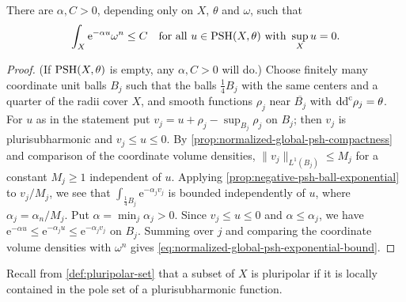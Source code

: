 \begin{corollary}\label{cor:normalized-global-psh-exponential-bound}
There are $\alpha,C>0$, depending only on $X$, $\theta$ and $\omega$, such that
\begin{equation}\label{eq:normalized-global-psh-exponential-bound}
 \int_X\mathrm e^{-\alpha u}\omega^n\leq C
       \quad\text{for all }u\in\mathrm{PSH}(X,\theta)\text{ with }\sup_Xu=0.
\end{equation}
\end{corollary}
\begin{proof}
(If $\mathrm{PSH}(X,\theta)$ is empty, any $\alpha,C>0$ will do.) Choose finitely many coordinate unit balls $B_j$ such that the balls $\frac14B_j$ with the same centers and a quarter of the radii cover $X$, and smooth functions $\rho_j$ near $\overline{B_j}$ with $\mathrm{dd}^{\mathrm{c}}\rho_j=\theta$. For $u$ as in the statement put $v_j=u+\rho_j-\sup_{B_j}\rho_j$ on $B_j$; then $v_j$ is plurisubharmonic and $v_j\leq u\leq0$. By \cref{prop:normalized-global-psh-compactness} and comparison of the coordinate volume densities, $\|v_j\|_{L^1(B_j)}\leq M_j$ for a constant $M_j\geq1$ independent of $u$. Applying \cref{prop:negative-psh-ball-exponential} to $v_j/M_j$, we see that $\int_{\frac14B_j}\mathrm e^{-\alpha_jv_j}$ is bounded independently of $u$, where $\alpha_j=\alpha_n/M_j$. Put $\alpha=\min_j\alpha_j>0$. Since $v_j\leq u\leq0$ and $\alpha\leq\alpha_j$, we have $\mathrm e^{-\alpha u}\leq\mathrm e^{-\alpha_ju}\leq\mathrm e^{-\alpha_jv_j}$ on $B_j$. Summing over $j$ and comparing the coordinate volume densities with $\omega^n$ gives \eqref{eq:normalized-global-psh-exponential-bound}.
\end{proof}

Recall from \cref{def:pluripolar-set} that a subset of $X$ is pluripolar if it is locally contained in the pole set of a plurisubharmonic function.

